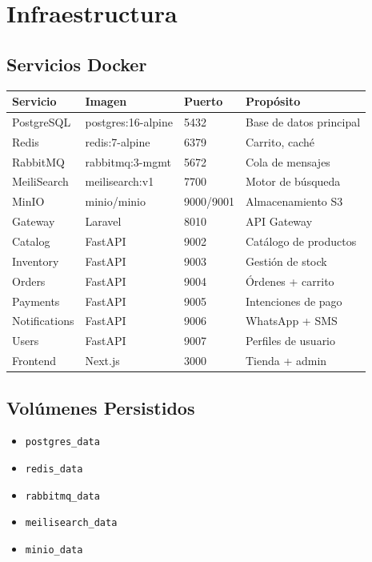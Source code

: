 \documentclass[11pt,a4paper]{article}
\begin{document}
\section{Infraestructura}

\subsection{Servicios Docker}

\begin{tabularx}{\textwidth}{|l|l|l|X|}
\hline
\textbf{Servicio} & \textbf{Imagen} & \textbf{Puerto} & \textbf{Propósito} \\
\hline
PostgreSQL & postgres:16-alpine & 5432 & Base de datos principal \\
Redis & redis:7-alpine & 6379 & Carrito, caché \\
RabbitMQ & rabbitmq:3-mgmt & 5672 & Cola de mensajes \\
MeiliSearch & meilisearch:v1 & 7700 & Motor de búsqueda \\
MinIO & minio/minio & 9000/9001 & Almacenamiento S3 \\
Gateway & Laravel & 8010 & API Gateway \\
Catalog & FastAPI & 9002 & Catálogo de productos \\
Inventory & FastAPI & 9003 & Gestión de stock \\
Orders & FastAPI & 9004 & Órdenes + carrito \\
Payments & FastAPI & 9005 & Intenciones de pago \\
Notifications & FastAPI & 9006 & WhatsApp + SMS \\
Users & FastAPI & 9007 & Perfiles de usuario \\
Frontend & Next.js & 3000 & Tienda + admin \\
\hline
\end{tabularx}

\subsection{Volúmenes Persistidos}
\begin{itemize}
    \item \texttt{postgres\_data}
    \item \texttt{redis\_data}
    \item \texttt{rabbitmq\_data}
    \item \texttt{meilisearch\_data}
    \item \texttt{minio\_data}
\end{itemize}
\end{document}
